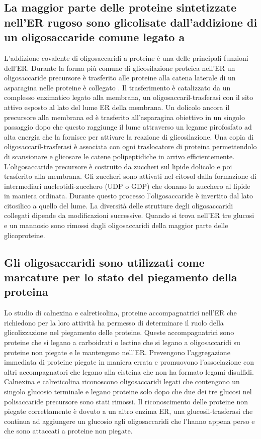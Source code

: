\subsection{La maggior parte delle proteine sintetizzate nell'ER rugoso sono glicolisate dall'addizione di un oligosaccaride comune legato a }
L'addizione covalente di oligosaccaridi a proteine \`e una delle principali funzioni dell'ER. Durante la forma pi\`u comune di glicosilazione proteica nell'ER un oligosaccaride 
precursore \`e trasferito alle proteine alla catena laterale  di un asparagina nelle proteine \`e collegato . Il trasferimento \`e catalizzato da un complesso enzimatico
legato alla membrana, un oligosaccaril-trasferasi con il sito attivo esposto al lato del lume ER della membrana. Un dolicolo ancora il precursore alla membrana ed \`e trasferito 
all'asparagina obiettivo in un singolo passaggio dopo che questo raggiunge il lume attraverso un legame pirofosfato ad alta energia che la fornisce per attivare la reazione di 
glicosilazione. Una copia di oligosaccaril-trasferasi \`e associata con ogni traslocatore di proteina permettendolo di scansionare e glicosare le catene polipeptidiche in arrivo 
efficientemente. L'oligosaccaride precursore \`e costruito da zuccheri sul lipide dolicolo e poi trasferito alla membrana. Gli zuccheri sono attivati nel citosol dalla formazione di
intermediari nucleotidi-zucchero (UDP o GDP) che donano lo zucchero al lipide in maniera ordinata. Durante questo processo l'oligosaccaride \`e invertito dal lato citosilico a quello
del lume. La diversit\`a delle strutture degli oligosaccaridi collegati  dipende da modificazioni successive. Quando si trova nell'ER tre glucosi e un mannosio sono rimossi
dagli oligosaccaridi della maggior parte delle glicoproteine. 
\subsection{Gli oligosaccaridi sono utilizzati come marcature per lo stato del piegamento della proteina}
Lo studio di calnexina e calreticolina, proteine accompagnatrici nell'ER che richiedono  per la loro attivit\`a ha permesso di determinare il ruolo della glicolizzazione 
nel piegamento delle proteine. Queste accompagnatrici sono proteine che si legano a carboidrati o lectine che si legano a oligosaccaridi su proteine non piegate e le mantengono nell'ER.
Prevengono l'aggregazione immediata di proteine piegate in maniera errata e promuovono l'associazione con altri accompagnatori che legano alla cisteina che non ha formato legami 
disulfidi. Calnexina e calreticolina riconoscono oligosaccaridi legati  che contengono un singolo glucosio terminale e legano proteine solo dopo che due dei tre glucosi nel 
polisaccaride precursore sono stati rimossi. Il riconoscimento delle proteine non piegate correttamente \`e dovuto a un altro enzima ER, una glucosil-trasferasi che continua ad 
aggiungere un glucosio agli oligosaccaridi che l'hanno appena perso e che sono attaccati a proteine non piegate. 
